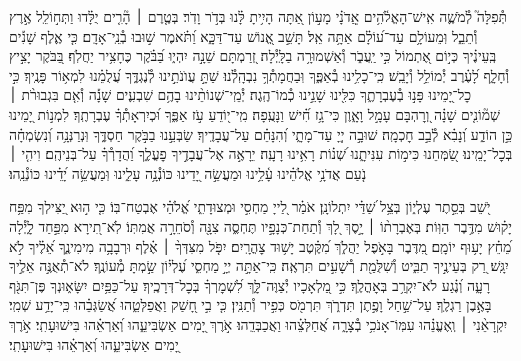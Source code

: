 \documentclass[twoside, openany, parskip=half, 11pt]{book}
\begin{document}
\begin{narrow}
תְּ֯פִלָּה֮ לְ֯מֹשֶׁ֢ה אִֽישׁ־הָאֱלֹ֫הִ֥ים
אֲֽדֹנָ֗י מָע֣וֹן אַ֭תָּה הָיִ֥יתָ לָּ֗נוּ בְּדֹ֣ר וָדֹֽר׃
בְּטֶ֤רֶם ׀ הָ֘רִ֤ים יֻלָּ֗דוּ וַתְּח֣וֹלֵֽל אֶ֣רֶץ וְ֯תֵבֵ֑ל וּֽמֵעוֹלָ֥ם עַד־ע֝וֹלָ֗ם אַתָּ֥ה אֵֽל׃
תָּשֵׁ֣ב אֱ֭נוֹשׁ עַד־דַּכָּ֑א וַ֝תֹּ֗אמֶר שׁ֣וּבוּ בְ֯נֵֽי־אָדָֽם׃
כִּ֤י אֶ֪לֶף שָׁנִ֡ים בְּֽעֵינֶ֗יךָ כְּי֣וֹם אֶ֭תְמוֹל כִּ֣י יַֽעֲבֹ֑ר וְ֯אַשְׁמוּרָ֥ה בַלָּֽיְ֯לָה׃
זְ֭רַמְתָּם שֵׁנָ֣ה יִהְי֑וּ בַּ֝בֹּ֗קֶר כֶּחָצִ֥יר יַחֲלֹֽף׃
בַּ֭בֹּקֶר יָצִ֣יץ וְ֯חָלָ֑ף לָ֝עֶ֗רֶב יְ֯מוֹלֵ֥ל וְ֯יָבֵֽשׁ׃
כִּֽי־כָלִ֥ינוּ בְ֯אַפֶּ֑ךָ וּֽבַחֲמָתְ֯ךָ֥ נִבְהָֽלְ֯נוּ׃
שַׁתָּ֣ עֲוֺנֹתֵ֣ינוּ לְ֯נֶגְדֶּ֑ךָ עֲ֝לֻמֵ֗נוּ לִמְא֥וֹר פָּנֶֽיךָ׃
כִּ֣י כׇל־יָ֭מֵינוּ פָּנ֣וּ בְ֯עֶבְרָתֶ֑ךָ כִּלִּ֖ינוּ שָׁנֵ֣ינוּ כְ֯מוֹ־הֶֽגֶה׃
יְ֯מֵֽי־שְׁנוֹתֵ֨ינוּ בָהֶ֥ם שִׁבְעִ֪ים שָׁנָ֡ה וְ֯אִ֤ם בִּגְבוּרֹ֨ת ׀ שְׁמ֘וֹנִ֤ים שָׁנָ֗ה וְ֭רׇהְבָּם עָמָ֣ל וָאָ֑וֶן כִּי־גָ֥ז חִ֗֝ישׁ וַנָּעֻֽפָה׃
מִֽי־י֭וֹדֵעַ עֹ֣ז אַפֶּ֑ךָ וּ֝כְיִרְאָתְ֯ךָ֗ עֶבְרָתֶֽךָ׃
לִמְנ֣וֹת יָ֭מֵינוּ כֵּ֣ן הוֹדַ֑ע וְ֝נָבִ֗א לְ֯בַ֣ב חׇכְמָֽה׃
שׁוּבָ֣ה יְיָ֭ עַד־מָתָ֑י וְ֝הִנָּחֵ֗ם עַל־עֲבָדֶֽיךָ׃
שַׂבְּעֵ֣נוּ בַבֹּ֣קֶר חַסְדֶּ֑ךָ וּֽנְרַנְּנָ֥ה וְ֝נִשְׂמְחָ֗ה בְּכׇל־יָמֵֽינוּ׃
שַׂ֭מְּחֵנוּ כִּימ֣וֹת עִנִּיתָ֑נוּ שְׁ֝נ֗וֹת רָאִ֥ינוּ רָעָֽה׃
יֵרָאֶ֣ה אֶל־עֲבָדֶ֣יךָ פׇעֳלֶ֑ךָ וַ֝הֲדָרְ֯ךָ֗ עַל־בְּנֵיהֶֽם׃
וִיהִ֤י ׀ נֹ֤עַם אֲדֹנָ֥י אֱלֹהֵ֗ינוּ עָ֫לֵ֥ינוּ וּמַעֲשֵׂ֣ה יָ֭דֵינוּ כּוֹנְ֯נָ֥ה עָלֵ֑ינוּ וּֽמַעֲשֵׂ֥ה יָ֝דֵ֗ינוּ כּוֹנְ֯נֵֽהוּ׃


יֹ֭שֵׁב בְּסֵ֣תֶר עֶלְי֑וֹן בְּצֵ֥ל שַׁ֝דַּ֗י יִתְלוֹנָֽן׃
אֹמַ֗ר לַ֭ייָ מַחְסִ֣י וּמְצוּדָתִ֑י אֱ֝לֹהַ֗י אֶבְטַח־בּֽוֹ׃
כִּ֤י ה֣וּא יַ֭צִּילְךָ מִפַּ֥ח יָק֗וּשׁ מִדֶּ֥בֶר הַוּֽוֹת׃
בְּאֶבְרָת֨וֹ ׀ יָ֣סֶךְ לָ֭ךְ וְ֯תַחַת־כְּנָפָ֣יו תֶּחְסֶ֑ה צִנָּ֖ה וְ֯סֹחֵרָ֣ה אֲמִתּֽוֹ׃
לֹֽא־תִ֭ירָא מִפַּ֣חַד לָ֑יְ֯לָה מֵ֝חֵ֗ץ יָע֥וּף יוֹמָֽם׃
מִ֭דֶּבֶר בָּאֹ֣פֶל יַהֲלֹ֑ךְ מִ֝קֶּ֗טֶב יָשׁ֥וּד צׇהֳרָֽיִם׃
יִפֹּ֤ל מִצִּדְּךָ֨ ׀ אֶ֗לֶף וּרְבָבָ֥ה מִימִינֶ֑ךָ אֵ֝לֶ֗יךָ לֹ֣א יִגָּֽשׁ׃
רַ֭ק בְּעֵינֶ֣יךָ תַבִּ֑יט וְ֯שִׁלֻּמַ֖ת רְ֯שָׁעִ֣ים תִּרְאֶֽה׃
כִּֽי־אַתָּ֣ה יְיָ֣ מַחְסִ֑י עֶ֝לְי֗וֹן שַׂ֣מְתָּ מְ֯עוֹנֶֽךָ׃
לֹא־תְ֯אֻנֶּ֣ה אֵלֶ֣יךָ רָעָ֑ה וְ֝נֶ֗גַע לֹא־יִקְרַ֥ב בְּאׇהֳלֶֽךָ׃
כִּ֣י מַ֭לְאָכָיו יְ֯צַוֶּה־לָּ֑ךְ לִ֝שְׁמׇרְךָ֗ בְּכׇל־דְּרָכֶֽיךָ׃
עַל־כַּפַּ֥יִם יִשָּׂא֑וּנְךָ פֶּן־תִּגֹּ֖ף בָּאֶ֣בֶן רַגְלֶֽךָ׃
עַל־שַׁ֣חַל וָפֶ֣תֶן תִּדְרֹ֑ךְ תִּרְמֹ֖ס כְּפִ֣יר וְ֯תַנִּֽין׃
כִּ֤י בִ֣י חָ֭שַׁק וַאֲפַלְּטֵ֑הוּ אֲ֝שַׂגְּבֵ֗הוּ כִּֽי־יָדַ֥ע שְׁמִֽי׃
יִקְרָאֵ֨נִי ׀ וְֽאֶעֱנֵ֗הוּ עִמּֽוֹ־אָנֹכִ֥י בְ֯צָרָ֑ה אֲ֝חַלְּצֵ֗הוּ וַאֲכַבְּדֵֽהוּ׃
אֹ֣רֶךְ יָ֭מִים אַשְׂבִּיעֵ֑הוּ וְ֝אַרְאֵ֗הוּ בִּישׁוּעָתִֽי׃
\scriptsize{אֹ֣רֶךְ יָ֭מִים אַשְׂבִּיעֵ֑הוּ וְ֝אַרְאֵ֗הוּ בִּישׁוּעָתִֽי׃ }
\normalsize{}


\end{narrow}
\end{document}
